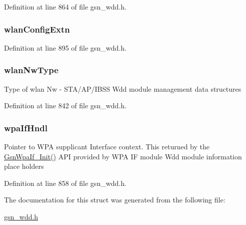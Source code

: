 Definition at line 864 of file gsn\_\-wdd.h.

\hypertarget{a00108_ae1f41411bdffd481f74e4f07ed263c47}{
\subsubsection[{wlanConfigExtn}]{ {\bf wlanConfigExtn}}}
\label{a00108_ae1f41411bdffd481f74e4f07ed263c47}


Definition at line 895 of file gsn\_\-wdd.h.

\hypertarget{a00108_a611759f3eaa5817846fb74212f7aaea5}{
\subsubsection[{wlanNwType}]{ {\bf wlanNwType}}}
\label{a00108_a611759f3eaa5817846fb74212f7aaea5}
Type of wlan Nw -\/ STA/AP/IBSS Wdd module management data structures 

Definition at line 842 of file gsn\_\-wdd.h.

\hypertarget{a00108_a5778d8bf3e35749d4a8e82de4de2af4c}{
\subsubsection[{wpaIfHndl}]{ {\bf wpaIfHndl}}}
\label{a00108_a5778d8bf3e35749d4a8e82de4de2af4c}
Pointer to WPA supplicant Interface context. This returned by the \hyperlink{a00687_ga0f9e51e12292ff32189550c167593fd7}{GsnWpaIf\_\-Init()} API provided by WPA IF module Wdd module information place holders 

Definition at line 858 of file gsn\_\-wdd.h.



The documentation for this struct was generated from the following file:\begin{DoxyCompactItemize}
\item 
\hyperlink{a00603}{gsn\_\-wdd.h}\end{DoxyCompactItemize}
